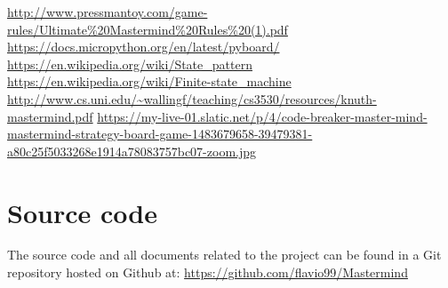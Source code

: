 \documentclass[a4paper, 12pt]{article}
\begin{document}
\begin{thebibliography}{9}
    \setlength\itemsep{0pt}
        \url{http://www.pressmantoy.com/game-rules/Ultimate%20Mastermind%20Rules%20(1).pdf}
        \url{https://docs.micropython.org/en/latest/pyboard/}
        \url{https://en.wikipedia.org/wiki/State_pattern}
        \url{https://en.wikipedia.org/wiki/Finite-state_machine}
        \url{http://www.cs.uni.edu/~wallingf/teaching/cs3530/resources/knuth-mastermind.pdf}
        \url{https://my-live-01.slatic.net/p/4/code-breaker-master-mind-mastermind-strategy-board-game-1483679658-39479381-a80c25f5033268e1914a78083757bc07-zoom.jpg}
\end{thebibliography}


\section*{Source code}
The source code and all documents related to the project can be found in
a Git repository hosted on Github at:
\url{https://github.com/flavio99/Mastermind}
\end{document}
